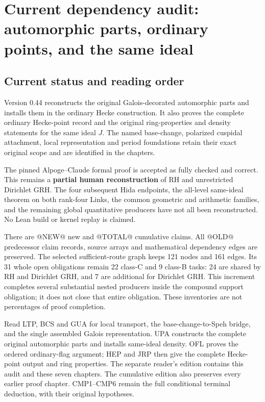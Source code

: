 \section{Current dependency audit: automorphic parts, ordinary points, and the same ideal}
\label{sec:dependency-audit-v44}

\subsection{Current status and reading order}

Version 0.44 reconstructs the original Galois-decorated automorphic
parts and installs them in the ordinary Hecke construction.  It also
proves the complete ordinary Hecke-point record and the original
ring-properties and density statements for the same ideal $J$.
The named base-change, polarized cuspidal attachment, local
representation and period foundations retain their exact original
scope and are identified in the chapters.

The pinned Alpoge--Claude formal proof is accepted as fully checked
and correct.  This remains a \textbf{partial human reconstruction}
of RH and unrestricted Dirichlet GRH.  The four subsequent Hida
endpoints, the all-level same-ideal theorem on both rank-four Links,
the common geometric and arithmetic families, and the remaining
global quantitative producers have not all been reconstructed.
No Lean build or kernel replay is claimed.

There are @NEW@ new and @TOTAL@ cumulative claims.  All @OLD@
predecessor claim records, source arrays and mathematical dependency
edges are preserved.  The selected sufficient-route graph keeps
121 nodes and 161 edges.  Its 31 whole open obligations remain
22 class-C and 9 class-B tasks: 24 are shared by RH and Dirichlet
GRH, and 7 are additional for Dirichlet GRH.  This increment
completes several substantial nested producers inside the compound
support obligation; it does not close that entire obligation.
These inventories are not percentages of proof completion.

Read LTP, BCS and GUA for local transport, the base-change-to-Speh
bridge, and the single assembled Galois representation.  UPA
constructs the complete original automorphic parts and installs
same-ideal density.  OFL proves the ordered ordinary-flag argument;
HEP and JRP then give the complete Hecke-point output and ring
properties.  The separate reader's edition contains this audit and
these seven chapters.  The cumulative edition also preserves every
earlier proof chapter.  CMP1--CMP6 remain the full conditional
terminal deduction, with their original hypotheses.

